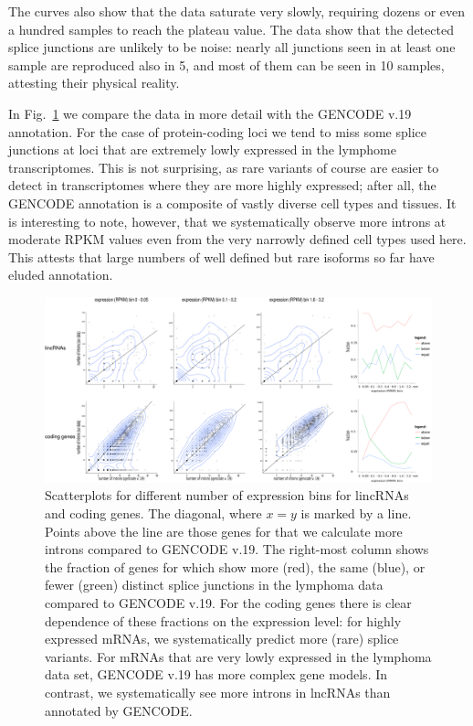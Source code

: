 \documentclass[ncrna,article,submit,moreauthors,pdftex,10pt,a4paper]{mdpi}
\begin{document}
The curves also show that the data saturate very slowly, requiring dozens or even a hundred samples to reach the plateau value. The data show that the detected splice junctions are unlikely to be noise: nearly all junctions seen in at least one sample are reproduced also in 5, and most of them can be seen in 10 samples, attesting their physical reality. 

In Fig.~\ref{fig:compare} we compare the data in more detail with the
GENCODE v.19 annotation. For the case of protein-coding loci we tend to
miss some splice junctions at loci that are extremely lowly expressed in
the lymphome transcriptomes. This is not surprising, as rare variants of
course are easier to detect in transcriptomes where they are more highly
expressed; after all, the GENCODE annotation is a composite of vastly
diverse cell types and tissues. It is interesting to note, however, that we systematically observe more introns at moderate RPKM values even from the very narrowly defined cell types used here. This attests that large numbers of well defined but rare isoforms so far have eluded annotation.

\begin{figure}[ht]
  \begin{center}
    \includegraphics[width=\textwidth]{Fig1}
  \end{center}
  \caption{Scatterplots for different number of expression bins for
    lincRNAs and coding genes.  The diagonal, where $x=y$ is marked by a
    line. Points above the line are those genes for that we calculate more
    introns compared to GENCODE v.19.  The right-most column shows the
    fraction of genes for which show more (red), the same (blue), or fewer
    (green) distinct splice junctions in the lymphoma data compared to
    GENCODE v.19.  For the coding genes there is clear dependence of these
    fractions on the expression level: for highly expressed mRNAs, we
    systematically predict more (rare) splice variants. For mRNAs that are
    very lowly expressed in the lymphoma data set, GENCODE v.19 has more
    complex gene models. In contrast, we systematically see more introns in
    lncRNAs than annotated by GENCODE.}
  \label{fig:compare}
\end{figure}
\end{document}
